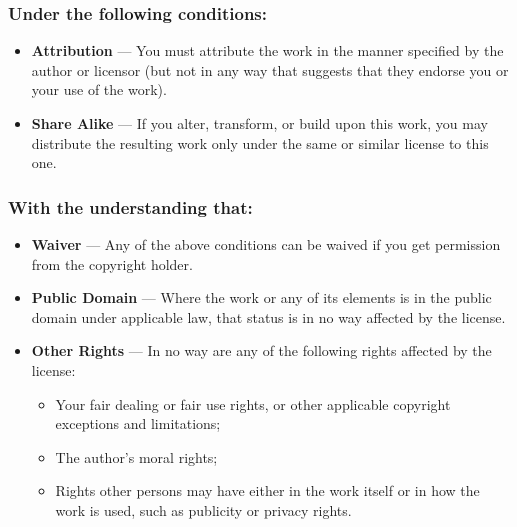 \subsubsection*{Under the following conditions:}
\begin{itemize}
\item 

 \textbf{Attribution}
 ---  You must attribute the work in the manner specified by the author or licensor (but not in any way that suggests that they endorse you or your use of the work).   


\item 

 \textbf{Share Alike}
 --- If you alter, transform, or build upon this work, you may distribute the resulting work only under the same or similar license to this one.  


\end{itemize}
\subsubsection*{ With the understanding that: }
\begin{itemize}
\item \textbf{Waiver}
 --- Any of the above conditions can be waived if you get permission from the copyright holder. 
\item \textbf{Public Domain}
 --- Where the work or any of its elements is in the public domain under applicable law, that status is in no way affected by the license. 
\item \textbf{Other Rights}
 --- In no way are any of the following rights affected by the license: \begin{itemize}
\item  Your fair dealing or fair use rights, or other applicable copyright exceptions and limitations; 
\item  The author's moral rights; 
\item  Rights other persons may have either in the work itself or in how the work is used, such as publicity or privacy rights. 

\end{itemize}
\end{itemize}
